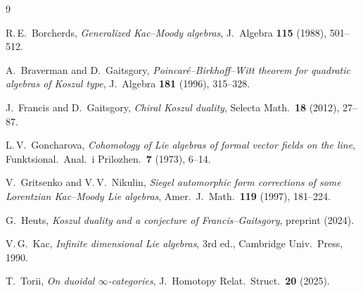 \documentclass[11pt,reqno]{amsart}
\theoremstyle{definition}
\theoremstyle{remark}
\begin{document}
\begin{thebibliography}{9}

R.\,E.~Borcherds,
\emph{Generalized Kac--Moody algebras},
J.\ Algebra \textbf{115} (1988), 501--512.

A.~Braverman and D.~Gaitsgory,
\emph{Poincar\'e--Birkhoff--Witt theorem for quadratic algebras of
Koszul type},
J.\ Algebra \textbf{181} (1996), 315--328.

J.~Francis and D.~Gaitsgory,
\emph{Chiral Koszul duality},
Selecta Math.\ \textbf{18} (2012), 27--87.

L.\,V.~Goncharova,
\emph{Cohomology of Lie algebras of formal vector fields on the line},
Funktsional.\ Anal.\ i Prilozhen.\ \textbf{7} (1973), 6--14.

V.~Gritsenko and V.\,V.~Nikulin,
\emph{Siegel automorphic form corrections of some Lorentzian
Kac--Moody Lie algebras},
Amer.\ J.\ Math.\ \textbf{119} (1997), 181--224.

G.~Heuts,
\emph{Koszul duality and a conjecture of Francis--Gaitsgory},
preprint (2024).

V.\,G.~Kac,
\emph{Infinite dimensional Lie algebras},
3rd ed., Cambridge Univ.\ Press, 1990.

T.~Torii,
\emph{On duoidal $\infty$-categories},
J.\ Homotopy Relat.\ Struct.\ \textbf{20} (2025).

\end{thebibliography}
\end{document}
